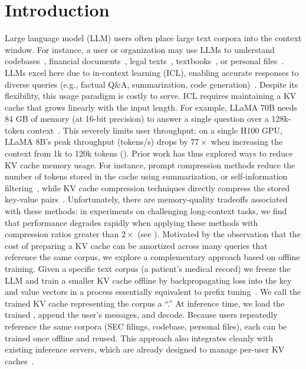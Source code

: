 \section{Introduction}
Large language model (LLM) users often place large text corpora into the context window. For instance, a user or organization may use LLMs to understand codebases~\cite{nam2024using}, financial documents~\cite{islam2023financebench}, legal texts~\cite{guha2023legalbench, zheng2025reasoning}, textbooks~\cite{ouellette2025can}, or personal files~\cite{arora2022can}.
LLMs excel here due to in-context learning (ICL), enabling accurate responses to diverse queries (e.g., factual Q\&A, summarization, code generation)~\cite{dong2022survey}.
Despite its flexibility, this usage paradigm is costly to serve. ICL requires maintaining a KV cache that grows linearly with the input length. For example, LLaMA 70B needs 84 GB of memory (at 16-bit precision) to answer a single question over a 128k-token context~\cite{dubey2024llama3}. This severely limits user throughput: on a single H100 GPU, LLaMA 8B’s peak throughput (tokens/s) drops by $77\times$ when increasing the context from 1k to 120k tokens ().
Prior work has thus explored ways to reduce KV cache memory usage. For instance, prompt compression methods reduce the number of tokens stored in the cache using summarization, or self-information filtering~\cite{jiang2023llmlingua,li2023unlocking,chuang2024learning}, while KV cache compression techniques directly compress the stored key-value pairs~\cite{ge2023model,zhang2023h2o,tang2024quest,oren2024transformers}. Unfortunately, there are memory-quality tradeoffs associated with these methods: in experiments on challenging long-context tasks, we find that performance  degrades rapidly when applying these methods with compression ratios greater than $2\times$ (see ).
Motivated by the observation that the cost of preparing a KV cache can be amortized across many queries that reference the same corpus, we explore a complementary approach based on offline training. Given a specific text corpus (\eg a patient's medical record) we freeze the LLM and train a smaller KV cache offline by backpropagating loss into the key and value vectors in a process essentially equivalent to prefix tuning~\cite{li2021prefix,lester2021power}. We call the trained KV cache representing the corpus  a ``\artifact.'' At inference time, we load the trained \artifact, append the user’s messages, and decode. Because users repeatedly reference the same corpora  (\eg SEC filings, codebase, personal files), each \artifact can be trained once offline and reused. This approach also integrates cleanly with existing inference servers, which are already designed to manage per-user KV caches~\cite{kwon2023efficient,zheng2024sglang,juravsky2025tokasaurus,ye2025flashinfer}.
